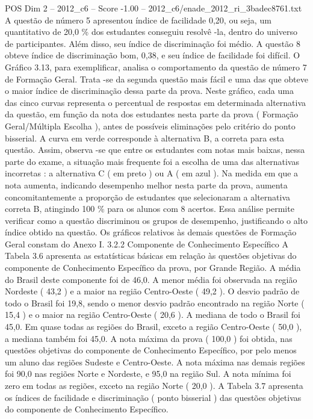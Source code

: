 \begin{textsample}{POS Dim 2 – 2012\_c6 – Score -1.00 – 2012\_c6/enade\_2012\_ri\_3badec8761.txt}
A questão de número 5 apresentou índice de facilidade 0,20, ou seja, um quantitativo de 20,0 \% dos estudantes conseguiu resolvê -la, dentro do universo de participantes.
Além disso, seu índice de discriminação foi médio.
A questão 8 obteve índice de discriminação bom, 0,38, e seu índice de facilidade foi difícil.
O Gráfico 3.13, para exemplificar, analisa o comportamento da questão de número 7 de Formação Geral.
Trata -se da segunda questão mais fácil e uma das que obteve o maior índice de discriminação dessa parte da prova.
Neste gráfico, cada uma das cinco curvas representa o percentual de respostas em determinada alternativa da questão, em função da nota dos estudantes nesta parte da prova ( Formação Geral/Múltipla Escolha ), antes de possíveis eliminações pelo critério do ponto bisserial.
A curva em verde corresponde à alternativa B, a correta para esta questão.
Assim, observa -se que entre os estudantes com notas mais baixas, nessa parte do exame, a situação mais frequente foi a escolha de uma das alternativas incorretas : a alternativa C ( em preto ) ou A ( em azul ).
Na medida em que a nota aumenta, indicando desempenho melhor nesta parte da prova, aumenta concomitantemente a proporção de estudantes que selecionaram a alternativa correta B, atingindo 100 \% para os alunos com 8 acertos.
Essa análise permite verificar como a questão discriminou os grupos de desempenho, justificando o alto índice obtido na questão.
Os gráficos relativos às demais questões de Formação Geral constam do Anexo I. 3.2.2 Componente de Conhecimento Específico A Tabela 3.6 apresenta as estatísticas básicas em relação às questões objetivas do componente de Conhecimento Específico da prova, por Grande Região.
A média do Brasil deste componente foi de 46,0.
A menor média foi observada na região Nordeste ( 43,2 ) e a maior na região Centro-Oeste ( 49,2 ).
O desvio padrão de todo o Brasil foi 19,8, sendo o menor desvio padrão encontrado na região Norte ( 15,4 ) e o maior na região Centro-Oeste ( 20,6 ).
A mediana de todo o Brasil foi 45,0.
Em quase todas as regiões do Brasil, exceto a região Centro-Oeste ( 50,0 ), a mediana também foi 45,0.
A nota máxima da prova ( 100,0 ) foi obtida, nas questões objetivas do componente de Conhecimento Específico, por pelo menos um aluno das regiões Sudeste e Centro-Oeste.
A nota máxima nas demais regiões foi 90,0 nas regiões Norte e Nordeste, e 95,0 na região Sul.
A nota mínima foi zero em todas as regiões, exceto na região Norte ( 20,0 ).
A Tabela 3.7 apresenta os índices de facilidade e discriminação ( ponto bisserial ) das questões objetivas do componente de Conhecimento Específico.

\end{textsample}
